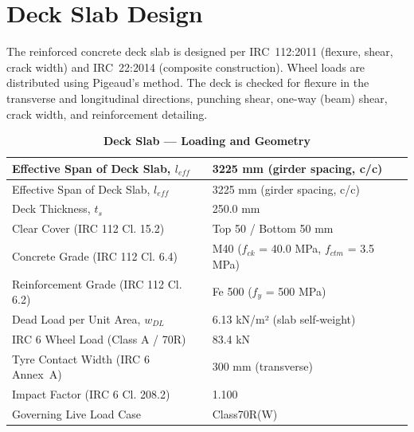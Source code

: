 \documentclass[12pt,a4paper]{report}
\numberwithin{table}{chapter}
\numberwithin{figure}{chapter}
\begin{document}
\section{Deck Slab Design}
\label{sec:deck-design}

The reinforced concrete deck slab is designed per IRC~112:2011 (flexure, shear, crack width) and IRC~22:2014 (composite construction). Wheel loads are distributed using Pigeaud's method. The deck is checked for flexure in the transverse and longitudinal directions, punching shear, one-way (beam) shear, crack width, and reinforcement detailing.

\vspace{1em}
\begin{longtable}{|L{5.5cm}|p{10.0cm}|}
\caption{\textbf{Deck Slab --- Loading and Geometry}}
\hline
{} \textnormal{Effective Span of Deck Slab, $l_{eff}$} & 3225 mm (girder spacing, c/c) \\[6pt]
\hline
\endfirsthead
\hline
{} \textnormal{Effective Span of Deck Slab, $l_{eff}$} & 3225 mm (girder spacing, c/c) \\[6pt]
\hline
\endhead
\textnormal{Deck Thickness, $t_s$} & 250.0 mm \\[6pt]
\hline
\textnormal{Clear Cover (IRC 112 Cl. 15.2)} & Top 50 / Bottom 50 mm \\[6pt]
\hline
\textnormal{Concrete Grade (IRC 112 Cl. 6.4)} & M40 ($f_{ck}$ = 40.0 MPa, $f_{ctm}$ = 3.5 MPa) \\[6pt]
\hline
\textnormal{Reinforcement Grade (IRC 112 Cl. 6.2)} & Fe 500 ($f_y$ = 500 MPa) \\[6pt]
\hline
\textnormal{Dead Load per Unit Area, $w_{DL}$} & 6.13 kN/m² (slab self-weight) \\[6pt]
\hline
\textnormal{IRC 6 Wheel Load (Class A / 70R)} & 83.4 kN \\[6pt]
\hline
\textnormal{Tyre Contact Width (IRC 6 Annex~A)} & 300 mm (transverse) \\[6pt]
\hline
\textnormal{Impact Factor (IRC 6 Cl. 208.2)} & 1.100 \\[6pt]
\hline
\textnormal{Governing Live Load Case} & Class70R(W) \\[6pt]
\hline
\end{longtable}
\end{document}

